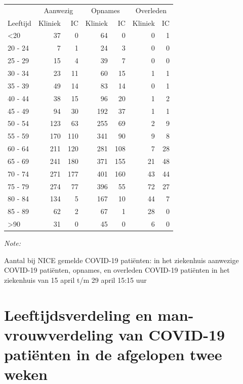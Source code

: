 \documentclass[
  english,
  man,floatsintext]{apa6}
\begin{document}
\begin{table}
\centering\begingroup\fontsize{10}{12}\selectfont

\begin{threeparttable}
\begin{tabular}{lrrrrrr}
\toprule
\multicolumn{1}{c}{ } & \multicolumn{2}{c}{Aanwezig} & \multicolumn{2}{c}{Opnames} & \multicolumn{2}{c}{Overleden} \\
\cmidrule(l{3pt}r{3pt}){2-3} \cmidrule(l{3pt}r{3pt}){4-5} \cmidrule(l{3pt}r{3pt}){6-7}
Leeftijd & Kliniek & IC & Kliniek & IC & Kliniek & IC\\
\midrule
<20 & 37 & 0 & 64 & 0 & 0 & 1\\
20 - 24 & 7 & 1 & 24 & 3 & 0 & 0\\
25 - 29 & 15 & 4 & 39 & 7 & 0 & 0\\
30 - 34 & 23 & 11 & 60 & 15 & 1 & 1\\
35 - 39 & 49 & 14 & 83 & 14 & 0 & 1\\
40 - 44 & 38 & 15 & 96 & 20 & 1 & 2\\
45 - 49 & 94 & 30 & 192 & 37 & 1 & 1\\
50 - 54 & 123 & 63 & 255 & 69 & 2 & 9\\
55 - 59 & 170 & 110 & 341 & 90 & 9 & 8\\
60 - 64 & 211 & 120 & 281 & 108 & 7 & 28\\
65 - 69 & 241 & 180 & 371 & 155 & 21 & 48\\
70 - 74 & 271 & 177 & 401 & 160 & 43 & 44\\
75 - 79 & 274 & 77 & 396 & 55 & 72 & 27\\
80 - 84 & 134 & 5 & 167 & 10 & 44 & 7\\
85 - 89 & 62 & 2 & 67 & 1 & 28 & 0\\
>90 & 31 & 0 & 45 & 0 & 6 & 0\\
\bottomrule
\end{tabular}
\begin{tablenotes}
\item \textit{Note: } 
\item Aantal bij NICE gemelde COVID-19 patiënten: in het ziekenhuis aanwezige COVID-19 patiënten, opnames, en overleden COVID-19 patiënten in het ziekenhuis van 15 april t/m 29 april 15:15 uur
\end{tablenotes}
\end{threeparttable}
\endgroup{}
\end{table}

\newpage

\hypertarget{leeftijdsverdeling-en-man-vrouwverdeling-van-covid-19-patiuxebnten-in-de-afgelopen-twee-weken}{%
\section{Leeftijdsverdeling en man-vrouwverdeling van COVID-19 patiënten in de afgelopen twee weken}\label{leeftijdsverdeling-en-man-vrouwverdeling-van-covid-19-patiuxebnten-in-de-afgelopen-twee-weken}}
\end{document}
